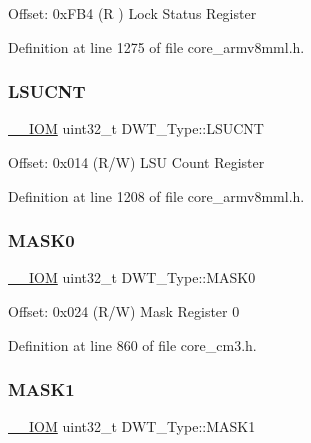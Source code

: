 Offset\+: 0x\+F\+B4 (R ) Lock Status Register 

Definition at line 1275 of file core\+\_\+armv8mml.\+h.

\mbox{\label{struct_d_w_t___type_acc05d89bdb1b4fe2fa499920ec02d0b1}} 
\subsubsection{\texorpdfstring{L\+S\+U\+C\+NT}{LSUCNT}}
{\footnotesize\ttfamily \hyperlink{core__sc300_8h_ab6caba5853a60a17e8e04499b52bf691}{\+\_\+\+\_\+\+I\+OM} uint32\+\_\+t D\+W\+T\+\_\+\+Type\+::\+L\+S\+U\+C\+NT}

Offset\+: 0x014 (R/W) L\+SU Count Register 

Definition at line 1208 of file core\+\_\+armv8mml.\+h.

\mbox{\label{struct_d_w_t___type_a821eb5e71f340ec077efc064cfc567db}} 
\subsubsection{\texorpdfstring{M\+A\+S\+K0}{MASK0}}
{\footnotesize\ttfamily \hyperlink{core__sc300_8h_ab6caba5853a60a17e8e04499b52bf691}{\+\_\+\+\_\+\+I\+OM} uint32\+\_\+t D\+W\+T\+\_\+\+Type\+::\+M\+A\+S\+K0}

Offset\+: 0x024 (R/W) Mask Register 0 

Definition at line 860 of file core\+\_\+cm3.\+h.

\mbox{\label{struct_d_w_t___type_aabf94936c9340e62fed836dcfb152405}} 
\subsubsection{\texorpdfstring{M\+A\+S\+K1}{MASK1}}
{\footnotesize\ttfamily \hyperlink{core__sc300_8h_ab6caba5853a60a17e8e04499b52bf691}{\+\_\+\+\_\+\+I\+OM} uint32\+\_\+t D\+W\+T\+\_\+\+Type\+::\+M\+A\+S\+K1}

